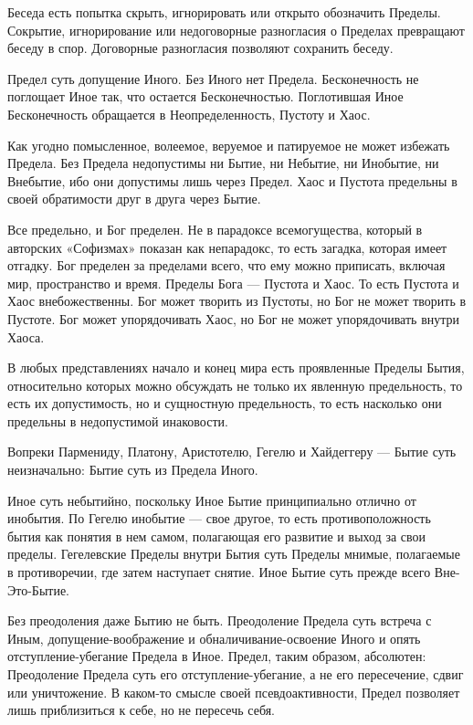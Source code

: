 Беседа есть попытка скрыть, игнорировать или открыто обозначить Пределы.
Сокрытие, игнорирование или недоговорные разногласия о Пределах превращают
беседу в спор. Договорные разногласия позволяют сохранить беседу.

Предел суть допущение Иного. Без Иного нет Предела. Бесконечность не поглощает
Иное так, что остается Бесконечностью. Поглотившая Иное Бесконечность
обращается в Неопределенность, Пустоту и Хаос.

Как угодно помысленное, волеемое, веруемое и патируемое не может избежать
Предела. Без Предела недопустимы ни Бытие, ни Небытие, ни Инобытие, ни
Внебытие, ибо они допустимы лишь через Предел. Хаос и Пустота предельны в своей
обратимости друг в друга через Бытие.

Все предельно, и Бог пределен. Не в парадоксе всемогущества, который в
авторских «Софизмах» показан как непарадокс, то есть загадка, которая имеет
отгадку. Бог пределен за пределами всего, что ему можно приписать, включая мир,
пространство и время. Пределы Бога — Пустота и Хаос. То есть Пустота и Хаос
внебожественны. Бог может творить из Пустоты, но Бог не может творить в
Пустоте. Бог может упорядочивать Хаос, но Бог не может упорядочивать внутри
Хаоса.

В любых представлениях начало и конец мира есть проявленные Пределы Бытия,
относительно которых можно обсуждать не только их явленную предельность, то
есть их допустимость, но и сущностную предельность, то есть насколько они
предельны в недопустимой инаковости.

Вопреки Пармениду, Платону, Аристотелю, Гегелю и Хайдеггеру — Бытие суть
неизначально: Бытие суть из Предела Иного.

Иное суть небытийно, поскольку Иное Бытие принципиально отлично от инобытия. По
Гегелю инобытие — свое другое, то есть противоположность бытия как понятия в
нем самом, полагающая его развитие и выход за свои пределы. Гегелевские Пределы
внутри Бытия суть Пределы мнимые, полагаемые в противоречии, где затем
наступает снятие. Иное Бытие суть прежде всего Вне-Это-Бытие.

Без преодоления даже Бытию не быть. Преодоление Предела суть встреча с Иным,
допущение-воображение и обналичивание-освоение Иного и опять
отступление-убегание Предела в Иное. Предел, таким образом, абсолютен:
Преодоление Предела суть его отступление-убегание, а не его пересечение, сдвиг
или уничтожение. В каком-то смысле своей псевдоактивности, Предел позволяет
лишь приблизиться к себе, но не пересечь себя.

